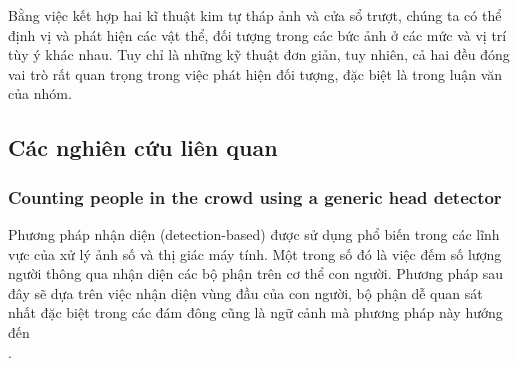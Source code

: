\documentclass[12pt,a4paper]{article}
\begin{document}
Bằng việc kết hợp hai kĩ thuật kim tự tháp ảnh và cửa sổ trượt, chúng ta có thể định vị và phát hiện các vật thể, đối tượng trong các bức ảnh ở các mức và vị trí tùy ý khác nhau. Tuy chỉ là những kỹ thuật đơn giản, tuy nhiên, cả hai đều đóng vai trò rất quan trọng trong  việc phát hiện đối tượng, đặc biệt là trong luận văn của nhóm.



\subsection{Các nghiên cứu liên quan}

		    \subsubsection{Counting people in the crowd using a generic head detector \cite{Head detector}}
Phương pháp nhận diện (detection-based) được sử dụng phổ biến trong các lĩnh vực của xử lý ảnh số và thị giác máy tính. Một trong số đó là việc đếm số lượng người thông qua nhận diện các bộ phận trên cơ thể con người. Phương pháp sau đây sẽ dựa trên việc nhận diện vùng đầu của con người, bộ phận dễ quan sát nhất đặc biệt trong các đám đông cũng là ngữ cảnh mà phương pháp này hướng đến\\.
\end{document}
